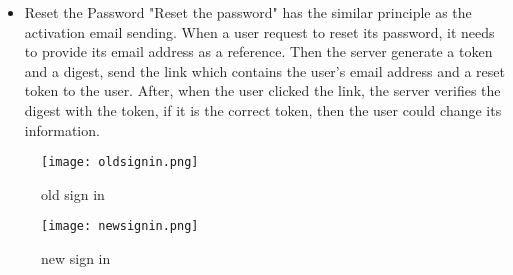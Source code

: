 \begin{enumerate}
\begin{itemize}
\item{Reset the Password}
"Reset the password" has the similar principle as the activation email sending. When a user request to reset its password, it needs to provide its email address as a reference. Then the server generate a token and a digest, send the link which contains the user's email address and a reset token to the user. After, when the user clicked the link, the server verifies the digest with the token, if it is the correct token, then the user could change its information.
\end{itemize}
\begin{figure}[h!]
\centering
\texttt{[image: oldsignin.png]}
\caption{old sign in }
\label{fig-sample}
\end{figure}

\begin{figure}[h!]
\centering
\texttt{[image: newsignin.png]}
\caption{new sign in }
\label{fig-sample}
\end{figure}


\end{enumerate}


